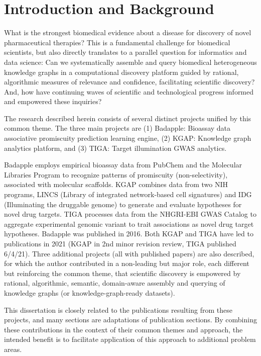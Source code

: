 \chapter{Introduction and Background}

What is the strongest biomedical evidence about a disease for discovery of novel pharmaceutical therapies? This is a fundamental challenge for biomedical scientists, but also directly translates to a parallel question for informatics and data science: Can we systematically assemble and query biomedical heterogeneous knowledge graphs in a computational discovery platform guided by rational, algorithmic measures of relevance and confidence, facilitating scientific discovery? And, how have continuing waves of scientific and technological progress informed and empowered these inquiries? 

The research described herein consists of several distinct projects unified by this common theme. The three main projects are (1) Badapple: Bioassay data associative promiscuity prediction learning engine, (2) KGAP: Knowledge graph analytics platform, and (3) TIGA: Target illumination GWAS analytics. 

Badapple employs empirical bioassay data from PubChem and the Molecular Libraries Program to recognize patterns of promiscuity (non-selectivity), associated with molecular scaffolds. KGAP combines data from two NIH programs, LINCS (Library of integrated network-based cell signatures)  and IDG (Illuminating the druggable genome) to generate and evaluate hypotheses for novel drug targets. TIGA processes data from the NHGRI-EBI GWAS Catalog to aggregate experimental genomic variant to trait associations as novel drug target hypotheses.  Badapple was published in 2016. Both KGAP and TIGA have led to publications in 2021 (KGAP in 2nd minor revision review, TIGA published 6/4/21). Three additional projects (all with published papers) are also described, for which the author contributed in a non-leading but major role, each different but reinforcing the common theme, that scientific discovery is empowered by rational, algorithmic, semantic, domain-aware assembly and querying of knowledge graphs (or knowledge-graph-ready datasets). 

This dissertation is closely related to the publications resulting from these projects, and many sections are adaptations of publication sections. By combining these contributions in the context of their common themes and approach, the intended benefit is to facilitate application of this approach to additional problem areas. 

